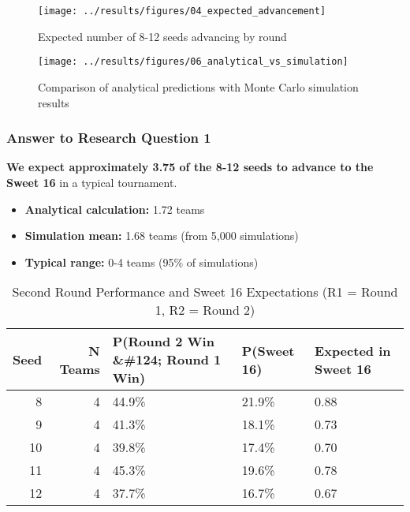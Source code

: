 \documentclass[
]{article}
\providecommand{\tightlist}{%
  \setlength{\itemsep}{0pt}\setlength{\parskip}{0pt}}
\begin{document}
\begin{figure}

{\centering \texttt{[image: ../results/figures/04\_expected\_advancement]} 

}

\caption{Expected number of 8-12 seeds advancing by round}\label{fig:advancement-plot}
\end{figure}

\begin{figure}

{\centering \texttt{[image: ../results/figures/06\_analytical\_vs\_simulation]} 

}

\caption{Comparison of analytical predictions with Monte Carlo simulation results}\label{fig:analytical-vs-sim}
\end{figure}

\subsubsection{Answer to Research Question
1}\label{answer-to-research-question-1}

\textbf{We expect approximately 3.75 of the 8-12 seeds to advance to the
Sweet 16} in a typical tournament.

\begin{itemize}
\tightlist
\item
  \textbf{Analytical calculation:} 1.72 teams
\item
  \textbf{Simulation mean:} 1.68 teams (from 5,000 simulations)
\item
  \textbf{Typical range:} 0-4 teams (95\% of simulations)
\end{itemize}

\begin{longtable}[t]{rrlll}
\caption{\label{tab:advancement-table}Second Round Performance and Sweet 16 Expectations (R1 = Round 1, R2 = Round 2)}\\
\toprule
Seed & N Teams & P(Round 2 Win \&\#124; Round 1 Win) & P(Sweet 16) & Expected in Sweet 16\\
\midrule
8 & 4 & 44.9\% & 21.9\% & 0.88\\
9 & 4 & 41.3\% & 18.1\% & 0.73\\
10 & 4 & 39.8\% & 17.4\% & 0.70\\
11 & 4 & 45.3\% & 19.6\% & 0.78\\
12 & 4 & 37.7\% & 16.7\% & 0.67\\
\bottomrule
\end{longtable}
\end{document}
